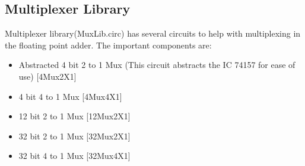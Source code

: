 \documentclass[12pt]{article}
\begin{document}
\subsection{Multiplexer Library}
Multiplexer library(MuxLib.circ) has several circuits to help with multiplexing in the floating point adder. The important components are:
\begin{itemize}
    \item Abstracted 4 bit 2 to 1 Mux (This circuit abstracts the IC 74157 for ease of use) [4Mux2X1]
    \item 4 bit 4 to 1 Mux [4Mux4X1]
    \item 12 bit 2 to 1 Mux [12Mux2X1]
    \item 32 bit 2 to 1 Mux [32Mux2X1]
    \item 32 bit 4 to 1 Mux [32Mux4X1]
\end{itemize}
\end{document}
